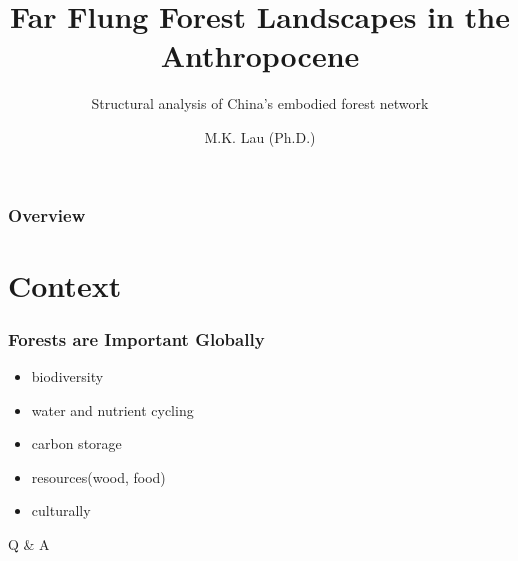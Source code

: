 \documentclass[aspectratio=169]{beamer}
\title{Far Flung Forest Landscapes in the Anthropocene}
\subtitle{Structural analysis of China's embodied forest network}
\author{M.K. Lau (Ph.D.)}
\institute{Chinese Academy of Sciences and Harvard University}
\begin{document}
\begin{frame}
  \titlepage
\end{frame}


\begin{frame}
  \frametitle{Overview}

\tableofcontents


\end{frame}


\section{Context}

\begin{frame}
  \frametitle{Forests are Important Globally}

  \begin{itemize}
  \item biodiversity
  \item water and nutrient cycling
  \item carbon storage
  \item resources(wood, food)
  \item culturally
  \end{itemize}

\end{frame}




\begin{frame}{Q \& A}

\end{frame}
\end{document}
